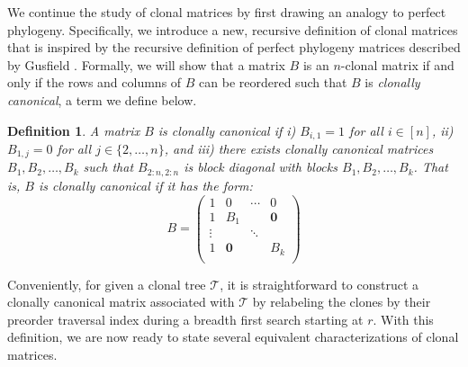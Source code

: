\documentclass[10pt]{article}
\newtheorem{definition}{Definition}
\newcommand{\tree}{\mathcal{T}}
\begin{document}
We continue the study of clonal matrices by first drawing an analogy to perfect phylogeny. 
Specifically, we introduce a new, recursive definition
of clonal matrices that is inspired by the recursive definition of perfect
phylogeny matrices described by Gusfield \cite{gusfield_efficient_1991, peer_incomplete_2000}. Formally,
we will show that a matrix $B$ is an $n$-clonal matrix if and only if
the rows and columns of $B$ can be reordered such that $B$ is \emph{clonally canonical},
a term we define below.

\begin{definition}
    A matrix $B$ is clonally canonical if i) $B_{i, 1} = 1$ for all $i \in [n]$,
    ii) $B_{1, j} = 0$ for all $j \in \{2, \ldots, n\}$, and iii) there exists 
    clonally canonical matrices $B_1, B_2, \ldots, B_k$ such that $B_{2:n , 2:n}$ is
    block diagonal with blocks $B_1, B_2, \ldots, B_k$. That is, $B$ is clonally canonical
    if it has the form:
    \[B= \left(\begin{array}{c|ccc}
        1 & 0 & \cdots & 0\\
        \hline
        1 & B_1 & & \mathbf{0} \\
        \vdots & & \ddots & \\
        1 & \mathbf{0} & & B_k \\
    \end{array}\right)\]
\end{definition}

Conveniently, for given a clonal tree $\tree$, it is straightforward to construct a clonally 
canonical matrix associated with $\tree$ by relabeling the clones by their preorder traversal 
index during a breadth first search starting at $r$. With this definition, we are now ready 
to state several equivalent characterizations of clonal matrices.
\end{document}
